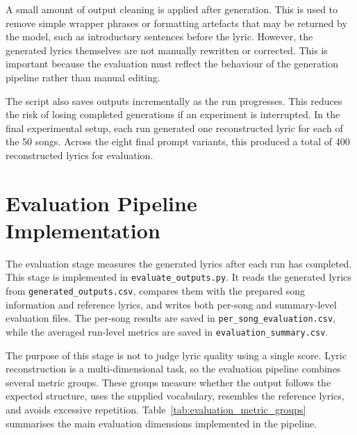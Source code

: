 A small amount of output cleaning is applied after generation. This is used to remove simple wrapper phrases or formatting artefacts that may be returned by the model, such as introductory sentences before the lyric. However, the generated lyrics themselves are not manually rewritten or corrected. This is important because the evaluation must reflect the behaviour of the generation pipeline rather than manual editing.

The script also saves outputs incrementally as the run progresses. This reduces the risk of losing completed generations if an experiment is interrupted. In the final experimental setup, each run generated one reconstructed lyric for each of the 50 songs. Across the eight final prompt variants, this produced a total of 400 reconstructed lyrics for evaluation.

\section{Evaluation Pipeline Implementation}

The evaluation stage measures the generated lyrics after each run has completed. This stage is implemented in \texttt{evaluate\_outputs.py}. It reads the generated lyrics from \texttt{generated\_outputs.csv}, compares them with the prepared song information and reference lyrics, and writes both per-song and summary-level evaluation files. The per-song results are saved in \texttt{per\_song\_evaluation.csv}, while the averaged run-level metrics are saved in \texttt{evaluation\_summary.csv}.

The purpose of this stage is not to judge lyric quality using a single score. Lyric reconstruction is a multi-dimensional task, so the evaluation pipeline combines several metric groups. These groups measure whether the output follows the expected structure, uses the supplied vocabulary, resembles the reference lyrics, and avoids excessive repetition. Table~\ref{tab:evaluation_metric_groups} summarises the main evaluation dimensions implemented in the pipeline.

